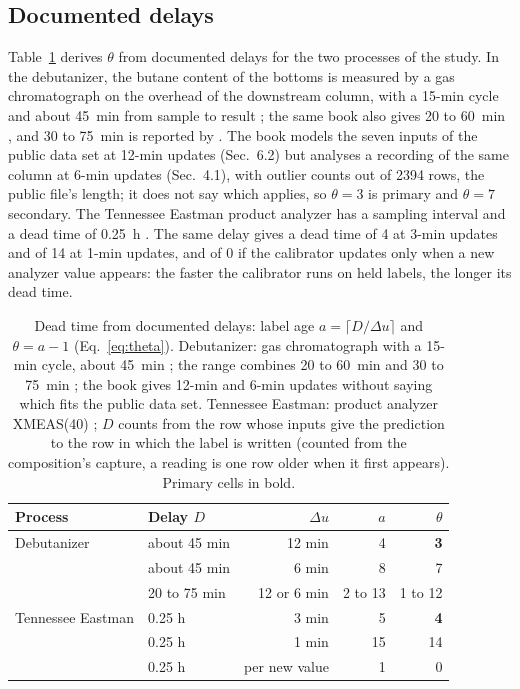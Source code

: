 \subsection{Documented delays}\label{sec:loop:delays}

Table~\ref{tab:delays} derives $\theta$ from documented delays for the two processes of the
study. In the debutanizer, the butane content of the bottoms is measured by a gas chromatograph
on the overhead of the downstream column, with a 15-min cycle and about 45~min from sample to
result \citep[Sec.~6.2]{fortuna2007}; the same book also gives 20 to 60~min
\citep[Sec.~5.5]{fortuna2007}, and 30 to 75~min is reported by \citet[p.~42]{siddharth2019}. The
book models the seven inputs of the public data set at 12-min updates (Sec.~6.2) but analyses a
recording of the same column at 6-min updates (Sec.~4.1), with outlier counts out of 2394 rows,
the public file's length; it does not say which applies, so $\theta = 3$ is primary and
$\theta = 7$ secondary. The Tennessee Eastman product analyzer has a sampling interval and a dead
time of 0.25~h \citep[Table~5]{downs1993}. The same delay gives a dead time of 4 at 3-min
updates and of 14 at 1-min updates, and of 0 if the calibrator updates only when a new analyzer
value appears: the faster the calibrator runs on held labels, the longer its dead time.

\begin{table}[t]
\centering\footnotesize
\caption{Dead time from documented delays: label age $a = \lceil D/\Delta u \rceil$ and
$\theta = a - 1$ (Eq.~\eqref{eq:theta}). Debutanizer: gas chromatograph with a 15-min cycle,
about 45~min \citep[Sec.~6.2]{fortuna2007}; the range combines 20 to 60~min
\citep[Sec.~5.5]{fortuna2007} and 30 to 75~min \citep[p.~42]{siddharth2019}; the book gives
12-min and 6-min updates without saying which fits the public data set. Tennessee Eastman:
product analyzer XMEAS(40) \citep[Table~5]{downs1993}; $D$ counts from the row whose inputs give
the prediction to the row in which the label is written (counted from the composition's capture,
a reading is one row older when it first appears). Primary cells in bold.}
\label{tab:delays}
\begin{tabular}{@{}llrrr@{}}
\toprule
Process & Delay $D$ & $\Delta u$ & $a$ & $\theta$ \\
\midrule
Debutanizer & about 45 min & 12 min & 4 & \textbf{3} \\
            & about 45 min & 6 min & 8 & 7 \\
            & 20 to 75 min & 12 or 6 min & 2 to 13 & 1 to 12 \\
Tennessee Eastman & 0.25 h & 3 min & 5 & \textbf{4} \\
                  & 0.25 h & 1 min & 15 & 14 \\
                  & 0.25 h & per new value & 1 & 0 \\
\bottomrule
\end{tabular}
\end{table}

